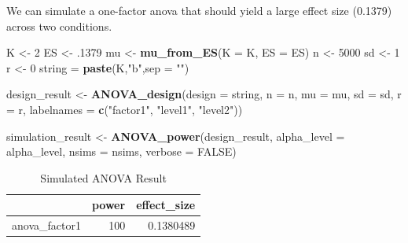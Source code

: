 \documentclass[]{book}
\newenvironment{Shaded}{\begin{snugshade}}{\end{snugshade}}
\newcommand{\DataTypeTok}[1]{\textcolor[rgb]{0.13,0.29,0.53}{#1}}
\newcommand{\DecValTok}[1]{\textcolor[rgb]{0.00,0.00,0.81}{#1}}
\newcommand{\FloatTok}[1]{\textcolor[rgb]{0.00,0.00,0.81}{#1}}
\newcommand{\KeywordTok}[1]{\textcolor[rgb]{0.13,0.29,0.53}{\textbf{#1}}}
\newcommand{\NormalTok}[1]{#1}
\newcommand{\OtherTok}[1]{\textcolor[rgb]{0.56,0.35,0.01}{#1}}
\newcommand{\StringTok}[1]{\textcolor[rgb]{0.31,0.60,0.02}{#1}}
\begin{document}
We can simulate a one-factor anova that should yield a large effect size (0.1379) across two conditions.

\begin{Shaded}
\begin{Highlighting}[]
\NormalTok{K <-}\StringTok{ }\DecValTok{2}
\NormalTok{ES <-}\StringTok{ }\FloatTok{.1379}
\NormalTok{mu <-}\StringTok{ }\KeywordTok{mu_from_ES}\NormalTok{(}\DataTypeTok{K =}\NormalTok{ K, }\DataTypeTok{ES =}\NormalTok{ ES)}
\NormalTok{n <-}\StringTok{ }\DecValTok{5000}
\NormalTok{sd <-}\StringTok{ }\DecValTok{1}
\NormalTok{r <-}\StringTok{ }\DecValTok{0}
\NormalTok{string =}\StringTok{ }\KeywordTok{paste}\NormalTok{(K,}\StringTok{"b"}\NormalTok{,}\DataTypeTok{sep =} \StringTok{""}\NormalTok{)}
\end{Highlighting}
\end{Shaded}

\begin{Shaded}
\begin{Highlighting}[]
\NormalTok{design_result <-}\StringTok{ }\KeywordTok{ANOVA_design}\NormalTok{(}\DataTypeTok{design =}\NormalTok{ string,}
                   \DataTypeTok{n =}\NormalTok{ n, }
                   \DataTypeTok{mu =}\NormalTok{ mu, }
                   \DataTypeTok{sd =}\NormalTok{ sd, }
                   \DataTypeTok{r =}\NormalTok{ r, }
                   \DataTypeTok{labelnames =} \KeywordTok{c}\NormalTok{(}\StringTok{"factor1"}\NormalTok{, }\StringTok{"level1"}\NormalTok{, }\StringTok{"level2"}\NormalTok{))}
\end{Highlighting}
\end{Shaded}

\begin{Shaded}
\begin{Highlighting}[]
\NormalTok{simulation_result <-}\StringTok{ }\KeywordTok{ANOVA_power}\NormalTok{(design_result, }
                                 \DataTypeTok{alpha_level =}\NormalTok{ alpha_level, }
                                 \DataTypeTok{nsims =}\NormalTok{ nsims,}
                                 \DataTypeTok{verbose =} \OtherTok{FALSE}\NormalTok{)}
\end{Highlighting}
\end{Shaded}

\begin{table}[t]

\caption{\label{tab:unnamed-chunk-90}Simulated ANOVA Result}
\centering
\begin{tabular}{l|r|r}
\hline
  & power & effect\_size\\
\hline
anova\_factor1 & 100 & 0.1380489\\
\hline
\end{tabular}
\end{table}
\end{document}

